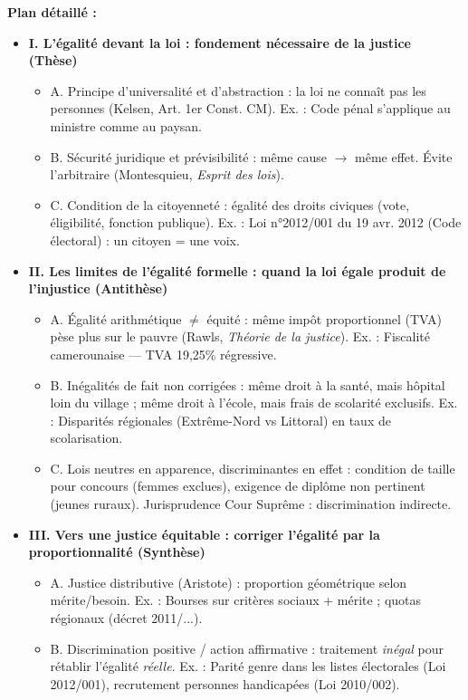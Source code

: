 \documentclass[11pt]{article}
\begin{document}
\begin{corrige}
\textbf{Plan détaillé :}
\begin{itemize}
    \item \textbf{I. L'égalité devant la loi : fondement nécessaire de la justice (Thèse)}
    \begin{itemize}
        \item A. Principe d'universalité et d'abstraction : la loi ne connaît pas les personnes (Kelsen, Art. 1er Const. CM). Ex. : Code pénal s'applique au ministre comme au paysan.
        \item B. Sécurité juridique et prévisibilité : même cause $\to$ même effet. Évite l'arbitraire (Montesquieu, \emph{Esprit des lois}).
        \item C. Condition de la citoyenneté : égalité des droits civiques (vote, éligibilité, fonction publique). Ex. : Loi n°2012/001 du 19 avr. 2012 (Code électoral) : un citoyen = une voix.
    \end{itemize}
    \item \textbf{II. Les limites de l'égalité formelle : quand la loi égale produit de l'injustice (Antithèse)}
    \begin{itemize}
        \item A. Égalité arithmétique $\neq$ équité : même impôt proportionnel (TVA) pèse plus sur le pauvre (Rawls, \emph{Théorie de la justice}). Ex. : Fiscalité camerounaise — TVA 19,25\% régressive.
        \item B. Inégalités de fait non corrigées : même droit à la santé, mais hôpital loin du village ; même droit à l'école, mais frais de scolarité exclusifs. Ex. : Disparités régionales (Extrême-Nord vs Littoral) en taux de scolarisation.
        \item C. Lois neutres en apparence, discriminantes en effet : condition de taille pour concours (femmes exclues), exigence de diplôme non pertinent (jeunes ruraux). Jurisprudence Cour Suprême : discrimination indirecte.
    \end{itemize}
    \item \textbf{III. Vers une justice équitable : corriger l'égalité par la proportionnalité (Synthèse)}
    \begin{itemize}
        \item A. Justice distributive (Aristote) : proportion géométrique selon mérite/besoin. Ex. : Bourses sur critères sociaux + mérite ; quotas régionaux (décret 2011/...).
        \item B. Discrimination positive / action affirmative : traitement \emph{inégal} pour rétablir l'égalité \emph{réelle}. Ex. : Parité genre dans les listes électorales (Loi 2012/001), recrutement personnes handicapées (Loi 2010/002).

\end{itemize}
\end{itemize}
\end{corrige}
\end{document}
